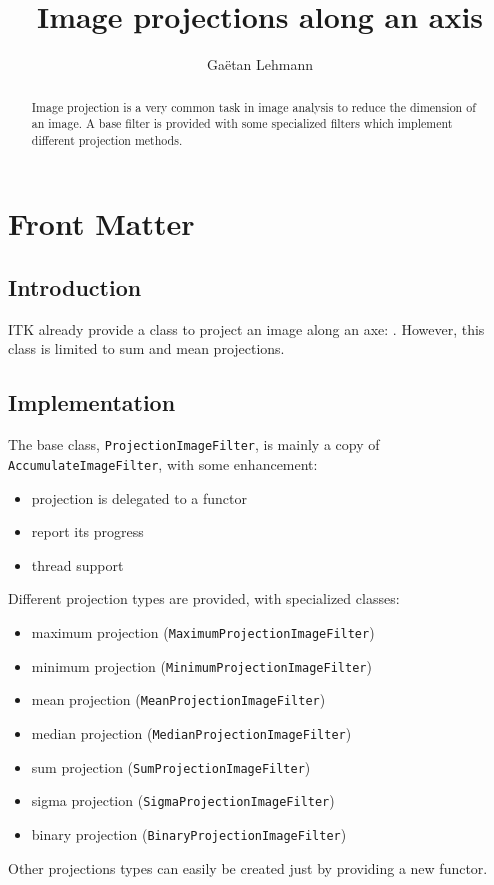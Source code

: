 \documentclass{InsightArticle}
\title{Image projections along an axis}
\author{Ga\"etan Lehmann}
\begin{document}
\maketitle

\ifhtml
\chapter*{Front Matter\label{front}}
\fi


\begin{abstract}
\noindent
Image projection is a very common task in image analysis to reduce the dimension
of an image. A base filter is provided with some specialized filters which
implement different projection methods.
\end{abstract}


\section{Introduction}
ITK already provide a class to project an image along an axe:
. However, this class is limited to sum
and mean projections.


\section{Implementation}

The base class, \verb$ProjectionImageFilter$, is mainly a copy of
\verb$AccumulateImageFilter$, with some enhancement:
\begin{itemize}
  \item projection is delegated to a functor
  \item report its progress
  \item thread support
\end{itemize}
Different projection types are provided, with specialized classes:
\begin{itemize}
  \item maximum projection (\verb$MaximumProjectionImageFilter$)
  \item minimum projection (\verb$MinimumProjectionImageFilter$)
  \item mean projection (\verb$MeanProjectionImageFilter$)
  \item median projection (\verb$MedianProjectionImageFilter$)
  \item sum projection (\verb$SumProjectionImageFilter$)
  \item sigma projection (\verb$SigmaProjectionImageFilter$)
  \item binary projection (\verb$BinaryProjectionImageFilter$)
\end{itemize}
Other projections types can easily be created just by providing a new functor.
\end{document}
